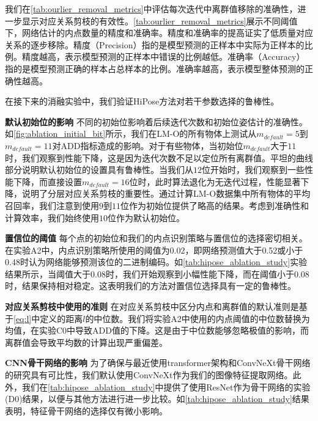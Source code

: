 我们在\autoref{tab:ourlier_removal_metrics}中评估每次迭代中离群值移除的准确性，进一步显示对应关系剪枝的有效性。\autoref{tab:ourlier_removal_metrics}展示不同阈值下，网络估计的内点数量的精度和准确率。精度和准确率的提高证实了低质量对应关系的逐步移除。精度（Precision）指的是模型预测的正样本中实际为正样本的比例。精度越高，表示模型预测的正样本中错误的比例越低。准确率（Accuracy）指的是模型预测正确的样本占总样本的比例。准确率越高，表示模型整体预测的正确性越高。



在接下来的消融实验中，我们验证HiPose方法对若干参数选择的鲁棒性。



\textbf{默认初始位的影响 }不同的初始位影响着后续迭代次数和初始位姿估计的准确性。
如\autoref{fig:ablation_initial_bit}所示，我们在LM-O的所有物体上测试从$m_{default} = 5$到$m_{default}=11$对ADD指标造成的影响。对于有些物体，当初始位$m_{default}$大于$11$时，我们观察到性能下降，这是因为迭代次数不足以定位所有离群值。平坦的曲线部分说明默认初始位的设置具有鲁棒性。当我们从$12$位开始时，我们观察到一些性能下降，而直接设置$m_{default} = 16$位时，此时算法退化为无迭代过程，性能显著下降，说明了分层对应关系剪枝的重要性。通过计算LM-O数据集中所有物体的平均召回率，我们注意到使用$9$到$11$位作为初始位提供了略高的结果。考虑到准确性和计算效率，我们始终使用$10$位作为默认初始位。

\textbf{置信位的阈值 }
每个点的初始位和我们的内点识别策略与置信位的选择密切相关。在实验A2中，内点识别策略所使用的阈值为$0.02$，即网络预测值大于0.52或小于0.48时认为网络能够预测该位的二进制编码。如\autoref{tab:hipose_ablation_study}实验结果所示，当阈值大于$0.08$时，我们开始观察到小幅性能下降，而在阈值小于$0.08$时，结果保持相对稳定。这表明我们的方法对置信位选择具有一定的鲁棒性。

\textbf{对应关系剪枝中使用的准则 }
在对应关系剪枝中区分内点和离群值的默认准则是基于\autoref{eq:l}中定义的距离$l$的中位数。我们将实验A2中使用的内点阈值的中位数替换为均值，在实验C0中导致ADD值的下降。这是由于中位数能够忽略极值的影响，而离群值会导致平均数的计算出现严重偏差。

\textbf{CNN骨干网络的影响 }
为了确保与最近使用transformer架构和ConvNeXt\cite{Liu2022ACF}骨干网络的研究具有可比性，我们默认使用ConvNeXt作为我们的图像特征提取网络。此外，我们在\autoref{tab:hipose_ablation_study}中提供了使用ResNet作为骨干网络的实验(D0)结果，以便与其他方法进行进一步比较。如\autoref{tab:hipose_ablation_study}结果表明，特征骨干网络的选择仅有微小影响。

